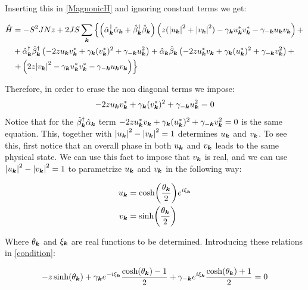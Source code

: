Inserting this in \ref{MagnonicH} and ignoring constant terms we get:

\begin{align}
\hat{H} &= -S^2JNz + 2JS \sum_{\boldsymbol{k}} \left\{ \left( \hat{\alpha}_{\boldsymbol{k}}^\dagger \hat{\alpha}_{\boldsymbol{k}} +\hat{\beta}_{\boldsymbol{k}}^\dagger \hat{\beta}_{\boldsymbol{k}} \right) \left( z(\abs{u_{\boldsymbol{k}}}^2+\abs{v_{\boldsymbol{k}}}^2) -\gamma_{\boldsymbol{k}}u_{\boldsymbol{k}}^*v_{\boldsymbol{k}}^* - \gamma_{-\boldsymbol{k}}u_{\boldsymbol{k}}v_{\boldsymbol{k}} \right) + \right. \nonumber \\
&+ \hat{\alpha}^\dagger_{\boldsymbol{k}} \hat{\beta}^\dagger_{\boldsymbol{k}} \left( -2zu_{\boldsymbol{k}}v_{\boldsymbol{k}}^* + \gamma_{\boldsymbol{k}}(v_{\boldsymbol{k}}^*)^2+\gamma_{-\boldsymbol{k}}u_{\boldsymbol{k}}^2 \right) + \hat{\alpha}_{\boldsymbol{k}}\hat{\beta}_{\boldsymbol{k}} \left( -2zu_{\boldsymbol{k}}^*v_{\boldsymbol{k}} + \gamma_{\boldsymbol{k}}(u_{\boldsymbol{k}}^*)^2+\gamma_{-\boldsymbol{k}}v_{\boldsymbol{k}}^2 \right) + \nonumber \\
&\left. + \left( 2z\abs{v_{\boldsymbol{k}}}^2 - \gamma_{\boldsymbol{k}}u_{\boldsymbol{k}}^* v_{\boldsymbol{k}}^* - \gamma_{-\boldsymbol{k}}u_{\boldsymbol{k}}v_{\boldsymbol{k}} \right) \right\} \label{AfterBogo}
\end{align}

Therefore, in order to erase the non diagonal terms we impose:
\begin{equation}
\label{condition}
-2zu_{\boldsymbol{k}}v_{\boldsymbol{k}}^* + \gamma_{\boldsymbol{k}}(v_{\boldsymbol{k}}^*)^2+\gamma_{-\boldsymbol{k}}u_{\boldsymbol{k}}^2 = 0
\end{equation}
Notice that for the $\hat{\beta}_{\boldsymbol{k}}^\dagger\hat{\alpha}_{\boldsymbol{k}}$ term $-2zu_{\boldsymbol{k}}^*v_{\boldsymbol{k}} + \gamma_{\boldsymbol{k}}(u_{\boldsymbol{k}}^*)^2+\gamma_{-\boldsymbol{k}}v_{\boldsymbol{k}}^2=0$ is the same equation. This, together with $\abs{u_{\boldsymbol{k}}}^2-\abs{v_{\boldsymbol{k}}}^2 = 1$ determines $u_{\boldsymbol{k}}$ and $v_{\boldsymbol{k}}$. To see this, first notice that an overall phase in both $u_{\boldsymbol{k}}$ and $v_{\boldsymbol{k}}$ leads to the same physical state. We can use this fact to impose that $v_{\boldsymbol{k}}$ is real, and we can use $\abs{u_{\boldsymbol{k}}}^2-\abs{v_{\boldsymbol{k}}}^2 = 1$ to parametrize $u_{\boldsymbol{k}}$ and $v_{\boldsymbol{k}}$ in the following way:

\begin{align}
u_{\boldsymbol{k}} &= \cosh(\frac{\theta_{\boldsymbol{k}}}{2})e^{i \xi_{\boldsymbol{k}}} \label{Bogou} \\
v_{\boldsymbol{k}} &= \sinh(\frac{\theta_{\boldsymbol{k}}}{2}) \label{Bogov}
\end{align}

Where $\theta_{\boldsymbol{k}}$ and $\xi_{\boldsymbol{k}}$ are real functions to be determined. Introducing these relations in \ref{condition}:

\begin{equation}
- z\sinh(\theta_{\boldsymbol{k}}) +\gamma_{\boldsymbol{k}}e^{-i \xi_{\boldsymbol{k}}}\frac{ \cosh(\theta_{\boldsymbol{k}})-1}{2} +\gamma_{-\boldsymbol{k}}e^{i\xi_{\boldsymbol{k}}}\frac{ \cosh(\theta_{\boldsymbol{k}})+1}{2} = 0
\end{equation}

